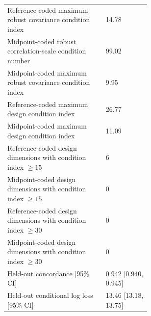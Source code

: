 \begin{longtable}{@{}p{0.4\linewidth}p{0.18\linewidth}@{}}
Reference-coded maximum robust covariance condition index & 14.78 \\
Midpoint-coded robust correlation-scale condition number & 99.02 \\
Midpoint-coded maximum robust covariance condition index & 9.95 \\
Reference-coded maximum design condition index & 26.77 \\
Midpoint-coded maximum design condition index & 11.09 \\
Reference-coded design dimensions with condition index $\geq 15$ & 6 \\
Midpoint-coded design dimensions with condition index $\geq 15$ & 0 \\
Reference-coded design dimensions with condition index $\geq 30$ & 0 \\
Midpoint-coded design dimensions with condition index $\geq 30$ & 0 \\
Held-out concordance [95\% CI] & 0.942 [0.940, 0.945] \\
Held-out conditional log loss [95\% CI] & 13.46 [13.18, 13.75] \\
\end{longtable}
